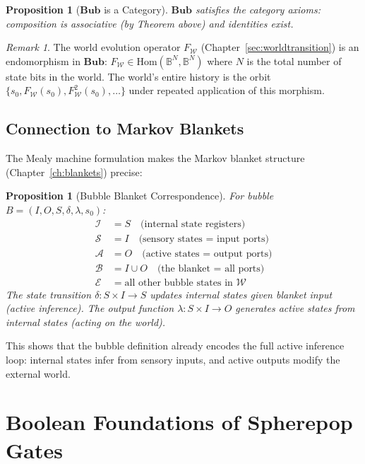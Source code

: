 \documentclass[11pt,a4paper,openany]{book}
\theoremstyle{plain}
\newtheorem{proposition}[theorem]{Proposition}
\theoremstyle{definition}
\theoremstyle{remark}
\newtheorem{remark}[theorem]{Remark}
\newcommand{\world}{\ensuremath{\mathcal{W}}}
\newcommand{\Fworld}{F_{\mathcal{W}}}
\begin{document}
\begin{proposition}[$\mathbf{Bub}$ is a Category]
  $\mathbf{Bub}$ satisfies the category axioms: composition is associative
  (by Theorem above) and identities exist.
\end{proposition}

\begin{remark}
  The world evolution operator $\Fworld$ (Chapter~\ref{sec:worldtransition})
  is an endomorphism in $\mathbf{Bub}$:
  $\Fworld \in \mathrm{Hom}(\mathbb{B}^N, \mathbb{B}^N)$ where $N$ is the
  total number of state bits in the world. The world's entire history is
  the orbit $\{s_0, \Fworld(s_0), \Fworld^2(s_0), \ldots\}$ under
  repeated application of this morphism.
\end{remark}

\section{Connection to Markov Blankets}

The Mealy machine formulation makes the Markov blanket structure
(Chapter~\ref{ch:blankets}) precise:

\begin{proposition}[Bubble Blanket Correspondence]
  For bubble $B = (I, O, S, \delta, \lambda, s_0)$:
  \begin{align*}
    \mathcal{I} &= S \quad \text{(internal state registers)} \\
    \mathcal{S} &= I \quad \text{(sensory states = input ports)} \\
    \mathcal{A} &= O \quad \text{(active states = output ports)} \\
    \mathcal{B} &= I \cup O \quad \text{(the blanket = all ports)} \\
    \mathcal{E} &= \text{all other bubble states in } \world
  \end{align*}
  The state transition $\delta : S \times I \to S$ updates internal
  states given blanket input (active inference). The output function
  $\lambda : S \times I \to O$ generates active states from internal
  states (acting on the world).
\end{proposition}

This shows that the bubble definition already encodes the full
active inference loop: internal states infer from sensory inputs,
and active outputs modify the external world.


\chapter{Boolean Foundations of Spherepop Gates}
\label{app:boolean}
\end{document}
